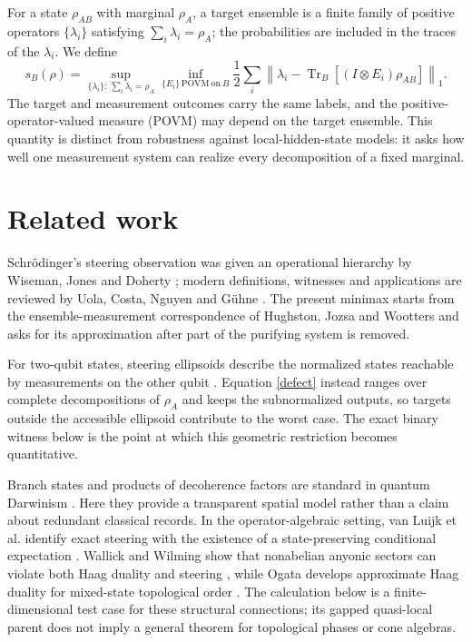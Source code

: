 \documentclass[11pt,a4paper]{article}
\theoremstyle{definition}
\theoremstyle{plain}
\DeclareMathOperator{\Tr}{Tr}
\newcommand{\norm}[1]{\left\lVert#1\right\rVert}
\begin{document}
For a state $\rho_{AB}$ with marginal $\rho_A$, a target ensemble is a finite
family of positive operators $\{\lambda_i\}$ satisfying
$\sum_i\lambda_i=\rho_A$; the probabilities are included in the traces of the
$\lambda_i$. We define
\begin{equation}\label{defect}
s_B(\rho)=\sup_{\{\lambda_i\}:\,\sum_i\lambda_i=\rho_A}
\inf_{\{E_i\}\,\mathrm{POVM\ on}\ B}
\frac12\sum_i\norm{\lambda_i-\Tr_B[(I\otimes E_i)\rho_{AB}]}_1.
\end{equation}
The target and measurement outcomes carry the same labels, and the
positive-operator-valued measure (POVM) may depend on the target ensemble.
This quantity is distinct from robustness against local-hidden-state models:
it asks how well one measurement system can realize every decomposition of a
fixed marginal.

\section{Related work}
Schr\"odinger's steering observation was given an operational hierarchy by
Wiseman, Jones and Doherty \cite{Wiseman}; modern definitions, witnesses and
applications are reviewed by Uola, Costa, Nguyen and G\"uhne \cite{Uola}.
The present minimax starts from the ensemble-measurement correspondence of
Hughston, Jozsa and Wootters \cite{HJW} and asks for its approximation after
part of the purifying system is removed.

For two-qubit states, steering ellipsoids describe the normalized states
reachable by measurements on the other qubit \cite{Jevtic}. Equation
\eqref{defect} instead ranges over complete decompositions of $\rho_A$ and
keeps the subnormalized outputs, so targets outside the accessible ellipsoid
contribute to the worst case. The exact binary witness below is the point at
which this geometric restriction becomes quantitative.

Branch states and products of decoherence factors are standard in quantum
Darwinism \cite{BlumeKohout,Zurek}. Here they provide a transparent spatial
model rather than a claim about redundant classical records. In the
operator-algebraic setting, van Luijk et al. identify exact steering with the
existence of a state-preserving conditional expectation \cite{vanLuijk}.
Wallick and Wilming show that nonabelian anyonic sectors can violate both Haag
duality and steering \cite{Wallick}, while Ogata develops approximate Haag
duality for mixed-state topological order \cite{Ogata}. The calculation below
is a finite-dimensional test case for these structural connections; its
gapped quasi-local parent does not imply a general theorem for topological
phases or cone algebras.
\end{document}
